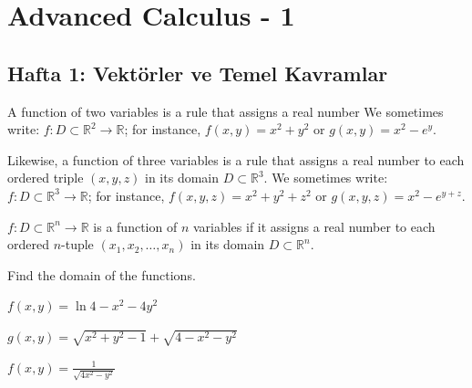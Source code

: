 \chapter{Advanced Calculus - 1}
\section{}


\section{Hafta 1: Vektörler ve Temel Kavramlar}
\begin{definition}
A function of two variables is a rule that assigns a real number
We sometimes write: $f: D \subset \mathbb{R}^2 \to \mathbb{R}$; for instance, $f(x,y) = x^2 + y^2$ or $g(x,y) = x^2 - e^y$.

    Likewise, a function of three variables is a rule that assigns a real number to each ordered triple
     $(x,y,z)$ in its domain $D \subset \mathbb{R}^3$. We sometimes write: $f: D \subset \mathbb{R}^3 \to \mathbb{R}$;
      for instance, $f(x,y,z) = x^2 + y^2 + z^2$ or $g(x,y,z) = x^2 - e^{y+z}$.

      $f : D \subset \mathbb{R}^n \to \mathbb{R}$ is a function of $n$ variables if it assigns a real number to each
       ordered $n$-tuple $(x_1, x_2, \ldots, x_n)$ in its domain $D \subset \mathbb{R}^n$.
\end{definition}



\begin{exampleauto}
Find the domain of the functions.

\begin{example}
    $f(x,y) = \ln{4 - x^2 - 4y^2}$
\end{example}
    
\begin{example}
    $g(x,y) = \sqrt{x^2 + y^2 -1} + \sqrt{4 - x^2 - y^2}$
\end{example}
 
\begin{example}
    $f(x,y) = \frac{1}{\sqrt{4x^2 - y^2}}$
\end{example}

\end{exampleauto}




